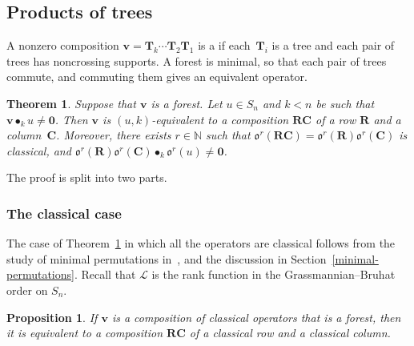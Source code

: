 \documentclass[11pt]{article}
\newtheorem{proposition}[theo]{Proposition}
\newtheorem{theorem}[theo]{Theorem}
\theoremstyle{definition}
\numberwithin{equation}{section}
\newcommand{\NN}{{\mathbb N}}
\newcommand{\calL}{{\mathcal L}}
\newcommand{\qv}{{\mathbf v}}
\newcommand{\bzero}{{\mathbf 0}}
\DeclareMathOperator{\kactionop}{{\scriptstyle \bullet}}
\newcommand{\kaction}[1][k]{\kactionop_{#1}}
\newcommand{\defcolor}[1]{{\color{RoyalBlue}#1}}
\newcommand{\demph}[1]{\defcolor{{\sl #1}}}
\newcommand{\ncycle}{\mathfrak o}
\def\R{\mathbf{R}}
\def\C{\mathbf{C}}
\def\T{\mathbf{T}}
\begin{document}
\subsection{Products of trees}
\label{SS:trees}
A nonzero composition $\qv=\T_k \cdots \T_2 \T_1$ is a \demph{forest} if each~$\T_i$ is a tree and each pair
of trees has noncrossing supports.
A forest is minimal, so that each pair of trees commute, and commuting them gives an equivalent operator.

\begin{theorem}
    \label{main-theorem}
    Suppose that $\qv$ is a forest.
    Let $u\in S_n$ and $k<n$ be such that $\qv\kaction u\neq\bzero$.
    Then $\qv$ is $(u,k)$-equivalent to a composition $\R\C$ of a row $\R$ and a column~$\C$.
    Moreover, there exists $r \in \NN$ such that $\ncycle^r(\R\C)=\ncycle^r(\R)\ncycle^r(\C)$ is classical,
    and $\ncycle^r(\R)\ncycle^r(\C)\kaction \ncycle^r(u)\neq\bzero$.
 \end{theorem}

The proof is split into two parts.

\subsubsection{The classical case}

The case of Theorem~\ref{main-theorem} in which all the operators are
classical follows from the study of minimal permutations in~\cite[Sect.~6.2]{BS-iso}, and the discussion in
Section~\ref{minimal-permutations}.
Recall that $\calL$ is the rank function in the Grassmannian--Bruhat order on $S_n$.

\begin{proposition}
    \label{BS2002}
    If $\qv$ is a composition of classical operators that is a forest, then it is equivalent to a composition $\R\C$ of a 
    classical row and a classical column. 
\end{proposition}
\end{document}
